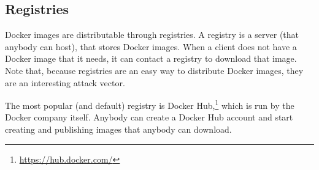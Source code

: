 \subsection{Registries}
Docker images are distributable through registries. A registry is a server (that anybody can host), that stores Docker images. When a client does not have a Docker image that it needs, it can contact a registry to download that image. Note that, because registries are an easy way to distribute Docker images, they are an interesting attack vector.

\medskip

The most popular (and default) registry is Docker Hub,\footnote{\url{https://hub.docker.com/}} which is run by the Docker company itself. Anybody can create a Docker Hub account and start creating and publishing images that anybody can download.
